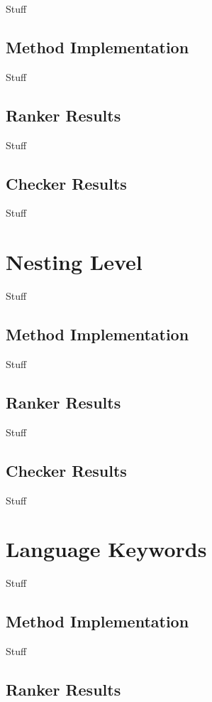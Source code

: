 \documentclass[ms,electronic,twosidetoc,letterpaper,chaptercenter,parttop,lol,lof,lot]{byumsphd}
\begin{document}
Stuff

\subsection{Method Implementation}

Stuff

\subsection{Ranker Results}

Stuff

\subsection{Checker Results}

Stuff

\section{Nesting Level}

Stuff

\subsection{Method Implementation}

Stuff

\subsection{Ranker Results}

Stuff

\subsection{Checker Results}

Stuff

\section{Language Keywords}

Stuff

\subsection{Method Implementation}

Stuff

\subsection{Ranker Results}
\end{document}
